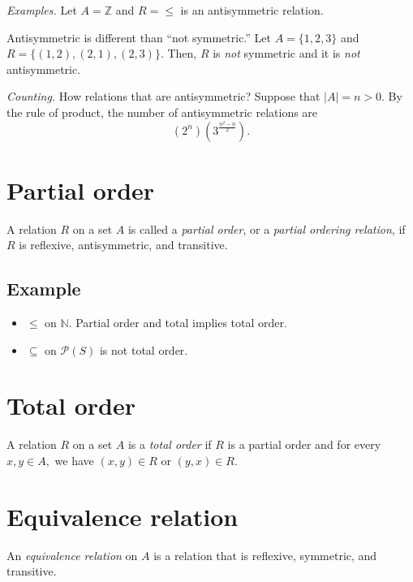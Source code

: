 \documentclass[11pt]{article}
\begin{document}
    \emph{Examples.} Let \(A = \mathbb{Z}\) and \(R = \leq\) is an antisymmetric relation.

    \vspace{1em}

    Antisymmetric is different than ``not symmetric.'' Let \(A = \{1,2,3\}\) and \(R = \{(1,2), (2,1), (2,3)\}\). Then, $R$ is \emph{not} symmetric and it is \emph{not} antisymmetric.

    \vspace{1em}

    \emph{Counting.} How relations that are antisymmetric? Suppose that \(|A| = n > 0\). By the rule of product, the number of antisymmetric relations are \[(2^n)(3^{\frac{n^2-n}{2}}).\]

    \section{Partial order}

    A relation $R$ on a set $A$ is called a \emph{partial order}, or a \emph{partial ordering relation}, if $R$ is reflexive, antisymmetric, and transitive.

    \subsection{Example}

    \begin{itemize}
        \item \(\leq\) on \(\mathbb{N}\). Partial order and total implies total order.
        \item \(\subseteq\) on \(\mathcal{P}(S)\) is not total order.
    \end{itemize}

    \section{Total order}

    A relation $R$ on a set $A$ is a \emph{total order} if $R$ is a partial order and for every \(x,y \in A,\) we have \((x,y) \in R\) or \((y,x) \in R\).

    \section{Equivalence relation}

    An \emph{equivalence relation} on $A$ is a relation that is reflexive, symmetric, and transitive.
\end{document}
